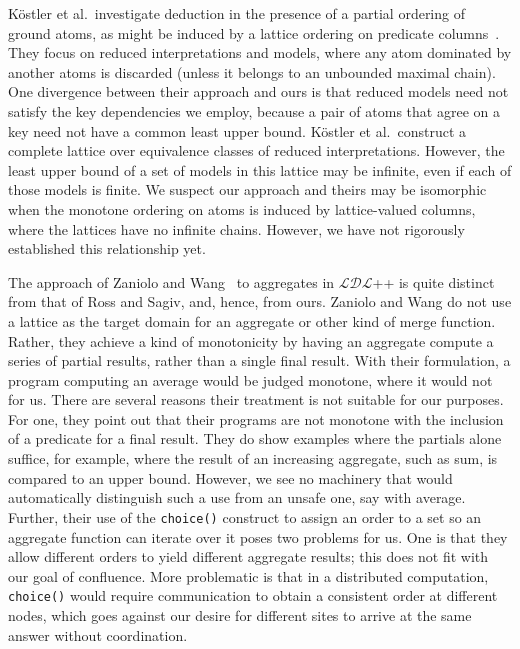 K\"{o}stler et al.\ investigate deduction in the presence of a partial ordering
of ground atoms, as might be induced by a lattice ordering on predicate
columns~\cite{Kostler1995}. They focus on reduced interpretations and models,
where any atom dominated by another atoms is discarded (unless it belongs to an
unbounded maximal chain). One divergence between their approach and ours is that
reduced models need not satisfy the key dependencies we employ, because a pair
of atoms that agree on a key need not have a common least upper bound.
K\"{o}stler et al.\ construct a complete lattice over equivalence classes of
reduced interpretations. However, the least upper bound of a set of models in
this lattice may be infinite, even if each of those models is finite. We suspect
our approach and theirs may be isomorphic when the monotone ordering on atoms
is induced by lattice-valued columns, where the lattices have no infinite
chains. However, we have not rigorously established this relationship yet.


The approach of Zaniolo and Wang~\cite{Zaniolo1999} to aggregates in
$\mathcal{LDL}$++ is quite distinct from that of Ross and Sagiv, and, hence,
from ours. Zaniolo and Wang do not use a lattice as the target domain for an
aggregate or other kind of merge function. Rather, they achieve a kind of
monotonicity by having an aggregate compute a series of partial results, rather
than a single final result. With their formulation, a program computing an
average would be judged monotone, where it would not for us. There are several
reasons their treatment is not suitable for our purposes. For one, they point
out that their programs are not monotone with the inclusion of a predicate for a
final result. They do show examples where the partials alone suffice, for
example, where the result of an increasing aggregate, such as sum, is compared
to an upper bound. However, we see no machinery that would automatically
distinguish such a use from an unsafe one, say with average. Further, their use
of the \texttt{choice()} construct to assign an order to a set so an aggregate
function can iterate over it poses two problems for us. One is that they allow
different orders to yield different aggregate results; this does not fit with
our goal of confluence. More problematic is that in a distributed computation,
\texttt{choice()} would require communication to obtain a consistent order at
different nodes, which goes against our desire for different sites to arrive at
the same answer without coordination.

